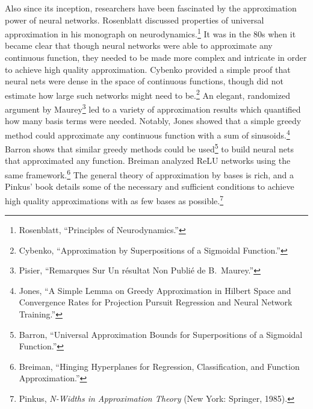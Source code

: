 \documentclass{tufte-book}
\begin{document}
Also since its inception, researchers have been fascinated by the
approximation power of neural networks. Rosenblatt discussed properties
of universal approximation in his monograph on neurodynamics.\footnote{Rosenblatt,
  {``Principles of Neurodynamics.''}} It was in the 80s when it became
clear that though neural networks were able to approximate any
continuous function, they needed to be made more complex and intricate
in order to achieve high quality approximation. Cybenko provided a
simple proof that neural nets were dense in the space of continuous
functions, though did not estimate how large such networks might need to
be.\footnote{Cybenko, {``Approximation by Superpositions of a Sigmoidal
  Function.''}} An elegant, randomized argument by Maurey\footnote{Pisier,
  {``Remarques Sur Un résultat Non Publié de {B}.~{M}aurey.''}} led to a
variety of approximation results which quantified how many basis terms
were needed. Notably, Jones showed that a simple greedy method could
approximate any continuous function with a sum of sinusoids.\footnote{Jones,
  {``A Simple Lemma on Greedy Approximation in {H}ilbert Space and
  Convergence Rates for Projection Pursuit Regression and Neural Network
  Training.''}} Barron shows that similar greedy methods could be
used\footnote{Barron, {``Universal Approximation Bounds for
  Superpositions of a Sigmoidal Function.''}} to build neural nets that
approximated any function. Breiman analyzed ReLU networks using the same
framework.\footnote{Breiman, {``Hinging Hyperplanes for Regression,
  Classification, and Function Approximation.''}} The general theory of
approximation by bases is rich, and a Pinkus' book details some of the
necessary and sufficient conditions to achieve high quality
approximations with as few bases as possible.\footnote{Pinkus,
  \emph{N-Widths in Approximation Theory} (New York: Springer, 1985).}
\end{document}
